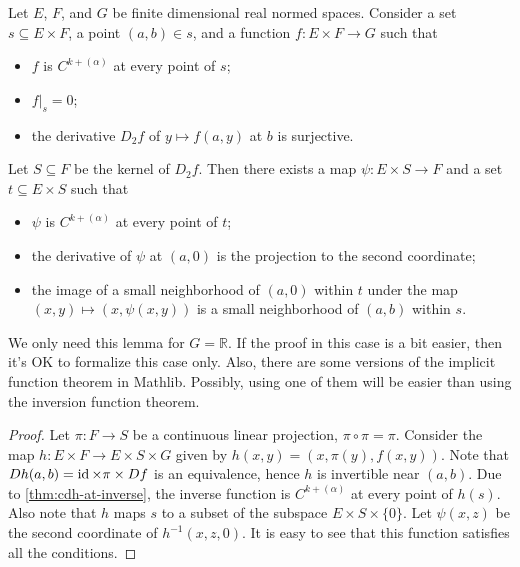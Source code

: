 \begin{lemma}%
  \label{thm:cdh-at-implicit-ker}
  Let \(E\), \(F\), and \(G\) be finite dimensional real normed spaces.
  Consider a set \(s \subseteq E \times F\), a point \((a, b) \in s\), and a function \(f\colon E \times F \to G\) such that
  \begin{itemize}
  \item \(f\) is \(C^{k+(\alpha)}\) at every point of \(s\);
  \item \(\left.f\right|_{s}=0\);
  \item the derivative \(D_{2}f\) of \(y \mapsto f(a, y)\) at \(b\) is surjective.
  \end{itemize}
  Let \(S \subseteq F\) be the kernel of \(D_{2}f\).
  Then there exists a map \(\psi\colon E \times S \to F\) and a set \(t \subseteq E \times S\) such that
  \begin{itemize}
  \item \(\psi\) is \(C^{k+(\alpha)}\) at every point of \(t\);
  \item the derivative of \(\psi\) at \((a, 0)\) is the projection to the second coordinate;
  \item the image of a small neighborhood of \((a, 0)\) within \(t\) under the map \((x, y)\mapsto (x, \psi(x, y))\)
    is a small neighborhood of \((a, b)\) within \(s\).
  \end{itemize}
\end{lemma}

\begin{remark}
  We only need this lemma for \(G=\mathbb R\).
  If the proof in this case is a bit easier, then it's OK to formalize this case only.
  Also, there are some versions of the implicit function theorem in Mathlib.
  Possibly, using one of them will be easier than using the inversion function theorem.
\end{remark}

\begin{proof}
  Let \(\pi\colon F\to S\) be a continuous linear projection, \(\pi \circ \pi = \pi\).
  Consider the map \(h\colon E \times F \to E \times S \times G\)
  given by \(h(x, y) = (x, \pi(y), f(x, y))\).
  Note that \(Dh(a, b) = \operatorname{id} \times \pi \times Df\) is an equivalence,
  hence \(h\) is invertible near \((a, b)\).
  Due to \autoref{thm:cdh-at-inverse}, the inverse function is \(C^{k+(\alpha)}\) at every point of \(h(s)\).
  Also note that \(h\) maps \(s\) to a subset of the subspace \(E\times S\times \{0\}\).
  Let \(\psi(x, z)\) be the second coordinate of \(h^{-1}(x, z, 0)\).
  It is easy to see that this function satisfies all the conditions.
\end{proof}

